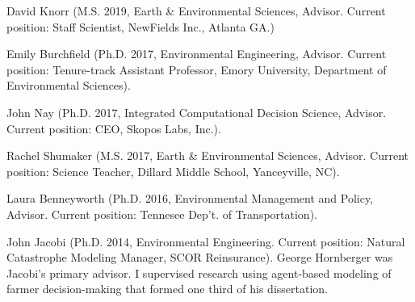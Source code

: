 \item David Knorr (M.S. 2019, Earth \& Environmental Sciences, Advisor. Current position: Staff Scientist, NewFields Inc., Atlanta GA.)
\item Emily Burchfield (Ph.D. 2017, Environmental Engineering, Advisor. Current position: Tenure-track Assistant Professor, Emory University, Department of Environmental Sciences).
\item John Nay (Ph.D. 2017, Integrated Computational Decision Science, Advisor. Current position: CEO, Skopos Labs, Inc.).
\item Rachel Shumaker (M.S. 2017, Earth \& Environmental Sciences, Advisor. Current position: Science Teacher, Dillard Middle School, Yanceyville, NC).
\item Laura Benneyworth (Ph.D. 2016, Environmental Management and Policy, Advisor. Current position: Tennesee Dep't. of Transportation).
\item John Jacobi (Ph.D. 2014, Environmental Engineering. Current position: Natural Catastrophe Modeling Manager, SCOR Reinsurance). George Hornberger was Jacobi's primary advisor. I supervised research using agent-based modeling of farmer decision-making that formed one third of his dissertation.
